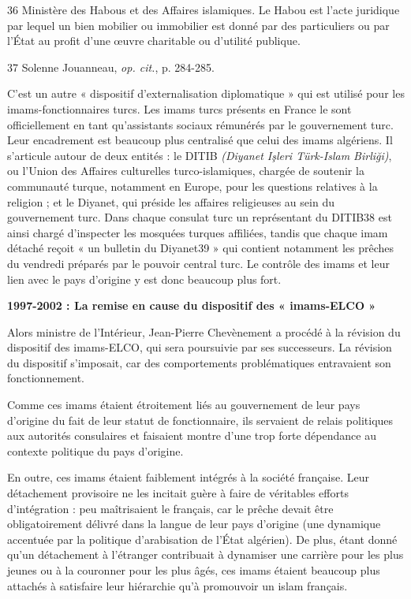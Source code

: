 36 Ministère des Habous et des Affaires islamiques. Le Habou est l'acte
juridique par lequel un bien mobilier ou immobilier est donné par des
particuliers ou par l'État au profit d'une œuvre charitable ou d'utilité
publique.

37 Solenne Jouanneau, \emph{op. cit.}, p. 284-285.



C'est un autre « dispositif d'externalisation diplomatique » qui est
utilisé pour les imams-fonctionnaires turcs. Les imams turcs présents en
France le sont officiellement en tant qu'assistants sociaux rémunérés
par le gouvernement turc. Leur encadrement est beaucoup plus centralisé
que celui des imams algériens. Il s'articule autour de deux entités : le
DITIB \emph{(Diyanet Işleri Türk-Islam Birliği)}, ou l'Union des
Affaires culturelles turco-islamiques, chargée de soutenir la communauté
turque, notamment en Europe, pour les questions relatives à la religion
; et le Diyanet, qui préside les affaires religieuses au sein du
gouvernement turc. Dans chaque consulat turc un représentant du DITIB38
est ainsi chargé d'inspecter les mosquées turques affiliées, tandis que
chaque imam détaché reçoit « un bulletin du Diyanet39 » qui contient
notamment les prêches du vendredi préparés par le pouvoir central turc.
Le contrôle des imams et leur lien avec le pays d'origine y est donc
beaucoup plus fort.

\textbf{1997-2002 : La remise en cause du dispositif des « imams-ELCO »}

Alors ministre de l'Intérieur, Jean-Pierre Chevènement a procédé à la
révision du dispositif des imams-ELCO, qui sera poursuivie par ses
successeurs. La révision du dispositif s'imposait, car des comportements
problématiques entravaient son fonctionnement.

Comme ces imams étaient étroitement liés au gouvernement de leur pays
d'origine du fait de leur statut de fonctionnaire, ils servaient de
relais politiques aux autorités consulaires et faisaient montre d'une
trop forte dépendance au contexte politique du pays d'origine.

En outre, ces imams étaient faiblement intégrés à la société française.
Leur détachement provisoire ne les incitait guère à faire de véritables
efforts d'intégration : peu maîtrisaient le français, car le prêche
devait être obligatoirement délivré dans la langue de leur pays
d'origine (une dynamique accentuée par la politique d'arabisation de
l'État algérien). De plus, étant donné qu'un détachement à l'étranger
contribuait à dynamiser une carrière pour les plus jeunes ou à la
couronner pour les plus âgés, ces imams étaient beaucoup plus attachés à
satisfaire leur hiérarchie qu'à promouvoir un islam français.

